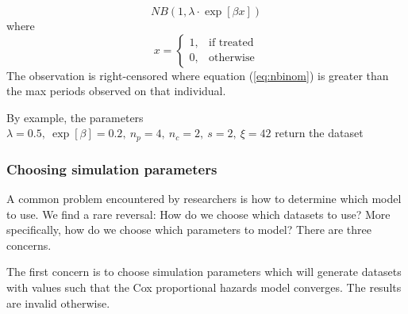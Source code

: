 
%
\begin{equation}
\label{eq:nbinom}
NB(1, \lambda \cdot \exp[\beta x])
\end{equation}
%
where
%
$$
  x=\begin{cases}
    1, & \text{if treated}\\
    0, & \text{otherwise}
  \end{cases}
$$
%
The observation is right-censored where equation (\ref{eq:nbinom}) is greater than the max periods observed on that individual. 

By example, the parameters $\lambda=0.5, ~\exp[\beta]=0.2, ~n_p=4, ~n_c=2, ~s=2, ~\xi=42$ return the dataset


\pgfplotsset{compat=newest}
\mytable
\pgfplotstabletypeset[fixed, %
precision=1, %
dec sep align %
]{\mytable}

\subsubsection{Choosing simulation parameters}
\label{sec:sim-params}
A common problem encountered by researchers is how to determine which model to use. We find a rare reversal: How do we choose which datasets to use? More specifically, how do we choose which parameters to model? There are three concerns.

The first concern is to choose simulation parameters which will generate datasets with values such that the Cox proportional hazards model converges. The results are invalid otherwise. 

